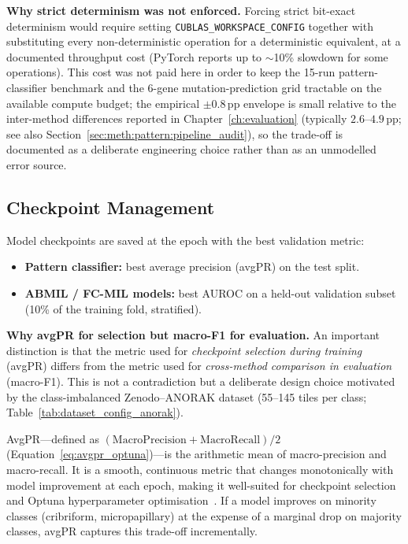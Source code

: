 \textbf{Why strict determinism was not enforced.}
Forcing strict bit-exact determinism would require setting
\texttt{CUBLAS\_WORKSPACE\_CONFIG} together with substituting every
non-deterministic operation for a deterministic equivalent, at a
documented throughput cost (PyTorch reports up to
$\sim$10\% slowdown for some operations).
This cost was not paid here in order to keep the 15-run
pattern-classifier benchmark and the 6-gene mutation-prediction grid
tractable on the available compute budget; the empirical $\pm 0.8$\,pp
envelope is small relative to the inter-method differences reported in
Chapter~\ref{ch:evaluation} (typically $2.6$--$4.9$\,pp; see also
Section~\ref{sec:meth:pattern:pipeline_audit}), so the trade-off is
documented as a deliberate engineering choice rather than as an
unmodelled error source.

\subsection{Checkpoint Management}
\label{sec:impl:repro:checkpoints}

Model checkpoints are saved at the epoch with the best validation
metric:
\begin{itemize}
    \item \textbf{Pattern classifier:} best average precision (avgPR)
    on the test split.
    \item \textbf{ABMIL / FC-MIL models:} best AUROC on a held-out
    validation subset (10\% of the training fold, stratified).
\end{itemize}

\textbf{Why avgPR for selection but macro-F1 for evaluation.}
An important distinction is that the metric used for
\emph{checkpoint selection during training} (avgPR) differs from the
metric used for \emph{cross-method comparison in evaluation}
(macro-F1).
This is not a contradiction but a deliberate design choice motivated
by the class-imbalanced Zenodo--ANORAK dataset (55--145 tiles per
class; Table~\ref{tab:dataset_config_anorak}).

AvgPR---defined as
$(\text{MacroPrecision} + \text{MacroRecall}) / 2$
(Equation~\ref{eq:avgpr_optuna})---is the arithmetic mean of
macro-precision and macro-recall.
It is a smooth, continuous metric that changes monotonically with
model improvement at each epoch, making it well-suited for
checkpoint selection and Optuna hyperparameter
optimisation~\cite{akiba2019optuna}.
If a model improves on minority classes (cribriform, micropapillary)
at the expense of a marginal drop on majority classes, avgPR
captures this trade-off incrementally.

